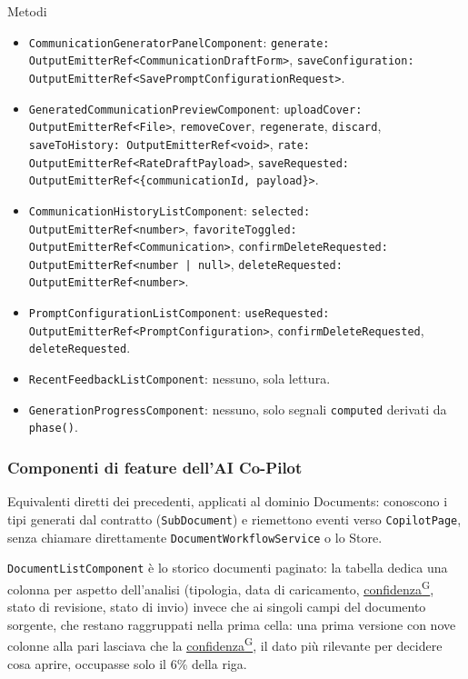 \documentclass[a4paper,12pt]{article}
\providecommand{\glslink}[2]{\href{https://alittlebyte-19.github.io/Documentazione/glossario.html\#gls-#1}{\underline{#2}\textsuperscript{\scriptsize G}}}
\begin{document}
\begin{sloppypar}
Metodi
\begin{itemize}\raggedright
    \item \texttt{CommunicationGeneratorPanelComponent}: \texttt{generate: OutputEmitterRef<CommunicationDraftForm>}, \texttt{saveConfiguration: OutputEmitterRef<SavePromptConfigurationRequest>}.
    \item \texttt{GeneratedCommunicationPreviewComponent}: \texttt{uploadCover: OutputEmitterRef<File>}, \texttt{removeCover}, \texttt{regenerate}, \texttt{discard}, \texttt{saveToHistory: OutputEmitterRef<void>}, \texttt{rate: OutputEmitterRef<RateDraftPayload>}, \texttt{saveRequested: OutputEmitterRef<\{communicationId, payload\}>}.
    \item \texttt{CommunicationHistoryListComponent}: \texttt{selected: OutputEmitterRef<number>}, \texttt{favoriteToggled: OutputEmitterRef<Communication>}, \texttt{confirmDeleteRequested: OutputEmitterRef<number | null>}, \texttt{deleteRequested: OutputEmitterRef<number>}.
    \item \texttt{PromptConfigurationListComponent}: \texttt{useRequested: OutputEmitterRef<PromptConfiguration>}, \texttt{confirmDeleteRequested}, \texttt{deleteRequested}.
    \item \texttt{RecentFeedbackListComponent}: nessuno, sola lettura.
    \item \texttt{GenerationProgressComponent}: nessuno, solo segnali \texttt{computed} derivati da \texttt{phase()}.
\end{itemize}

\subsubsection{Componenti di feature dell'AI Co-Pilot}

Equivalenti diretti dei precedenti, applicati al dominio Documents: conoscono i tipi generati dal contratto (\texttt{SubDocument}) e riemettono eventi verso \texttt{CopilotPage}, senza chiamare direttamente \texttt{DocumentWorkflowService} o lo Store.

\texttt{DocumentListComponent} è lo storico documenti paginato: la tabella dedica una colonna per aspetto dell'analisi (tipologia, data di caricamento, \glslink{confidenza-confidence-score}{confidenza}, stato di revisione, stato di invio) invece che ai singoli campi del documento sorgente, che restano raggruppati nella prima cella: una prima versione con nove colonne alla pari lasciava che la \glslink{confidenza-confidence-score}{confidenza}, il dato più rilevante per decidere cosa aprire, occupasse solo il 6\% della riga.


\end{sloppypar}
\end{document}
